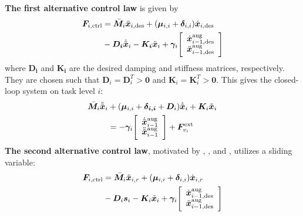 \documentclass[../main.tex]{subfiles}
\begin{document}
\textbf{The first alternative control law} is given by
\begin{align}
    \setlength{\abovedisplayskip}{0pt}
    \setlength{\belowdisplayskip}{0pt}
    \label{eq:F_i_ctrl_orig}
    \bm{F}_{i,{\rm ctrl}}
    &=
    \bar{\bm{M}}_i \ddot{\bm{x}}_{i,{\rm des}}
    + (\bm{\mu}_{i,i} + \bm{\delta}_{i,i} )\dot{\bm{x}}_{i,{\rm des}} \\
    &-\bm{D_i} \dot{\tilde{\bm{x}}}_i
    -\bm{K_i} \tilde{\bm{x}}_i
    + \bm{\gamma}_i\Bigg[ \begin{array}{c}
    \dot{\bm{x}}_{i-1,{\rm des}}^{\rm aug} \\
    \ddot{\bm{x}}_{i-1,{\rm des}}^{\rm aug} \\
    \end{array}\Bigg] \nonumber
\end{align}
where $\bm{D_i}$ and $\bm{K_i}$ are the desired damping and stiffness matrices, respectively. They are chosen such that $\bm{D}_i = \bm{D}_i^T > \bm{0}$ and $\bm{K}_i = \bm{K}_i^T > \bm{0}$. This gives the closed-loop system on task level $i$:
\begin{align}
    \label{eq:CL_orig}
    \bar{\bm{M}}_i \ddot{\tilde{\bm{x}}}_i
    &+ (\bm{\mu}_{i,i} + \bm{\delta_{i,i}}+ \bm{D}_i)\dot{\tilde{\bm{x}}}_i
    + \bm{K}_i \tilde{\bm{x}}_i \\
    &=
    - \bm{\gamma}_i\Bigg[ \begin{array}{c}
        \dot{\tilde{\bm{x}}}_{i-1}^{\rm aug} \\
        \ddot{\tilde{\bm{x}}}_{i-1}^{\rm aug} \\
    \end{array}\Bigg]
    + \bm{F}_{v_i}^{\rm ext}\nonumber
\end{align}
\textbf{The second alternative control law}, motivated by \cite{Slotine1987}, \cite{Berghuis1993}, and \cite{Sadegh1990}, utilizes a sliding variable:
\begin{align}
    \label{eq:F_i_ctrl_sliding}
    \bm{F}_{i,{\rm ctrl}}
    &=
    \bar{\bm{M}}_i \ddot{\bm{x}}_{i,r}
    + (\bm{\mu}_{i,i} + \bm{\delta}_{i,i} ) \dot{\bm{x}}_{i,r} \\
    &- \bm{D}_i \bm{s}_i
    - \bm{K}_i \tilde{\bm{x}}_i
    + \bm{\gamma}_i\Bigg[ \begin{array}{c}
        \dot{\bm{x}}_{i-1,{\rm des}}^{\rm aug} \\
        \ddot{\bm{x}}_{i-1,{\rm des}}^{\rm aug} \\
    \end{array}\Bigg] \nonumber
\end{align}
\end{document}
